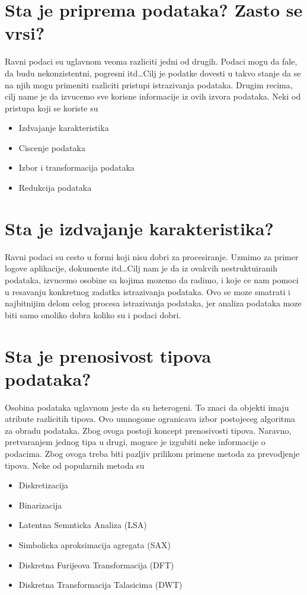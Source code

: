 \documentclass[a4paper]{article}
\begin{document}
\section{Sta je priprema podataka? Zasto se vrsi?}
Ravni podaci su uglavnom veoma razliciti jedni od drugih. Podaci mogu da fale, da budu
nekonzistentni, pogresni itd\ldots Cilj je podatke dovesti u takvo stanje da se na njih mogu
primeniti razliciti pristupi istrazivanja podataka. Drugim recima, cilj name je da izvucemo sve
korisne informacije iz ovih izvora podataka. Neki od pristupa koji se koriste su
\begin{itemize}
    \item Izdvajanje karakteristika
    \item Ciscenje podataka
    \item Izbor i transformacija podataka
    \item Redukcija podataka
\end{itemize}

\section{Sta je izdvajanje karakteristika?}
Ravni podaci su cesto u formi koji nisu dobri za procesiranje. Uzmimo za primer logove aplikacije,
dokumente itd\ldots Cilj nam je da iz ovakvih nestruktuiranih podataka, izvucemo osobine sa kojima
mozemo da radimo, i koje ce nam pomoci u resavanju konkretnog zadatka istrazivanja podataka. Ovo
se moze smatrati i najbitnijim delom celog procesa istrazivanja podataka, jer analiza podataka moze
biti samo onoliko dobra koliko su i podaci dobri.


\section{Sta je prenosivost tipova podataka?}
Osobina podataka uglavnom jeste da su heterogeni. To znaci da objekti imaju atribute razlicitih
tipova. Ovo umnogome ogranicava izbor postojeceg algoritma za obradu podataka. Zbog ovoga postoji
koncept prenosivosti tipova. Naravno, pretvaranjem jednog tipa u drugi, moguce je izgubiti neke
informacije o podacima. Zbog ovoga treba biti pazljiv prilikom primene metoda za prevodjenje tipova.
Neke od popularnih metoda su

\begin{itemize}
    \item Diskretizacija
    \item Binarizacija
    \item Latentna Semnticka Analiza (LSA)
    \item Simbolicka aproksimacija agregata (SAX)
    \item Diskretna Furijeova Transformacija (DFT)
    \item Diskretna Transformacija Talasicima (DWT)
\end{itemize}
\end{document}
